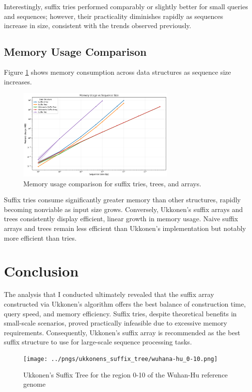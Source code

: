 \documentclass[11pt, letterpaper]{article}
\begin{document}
Interestingly, suffix tries performed comparably or slightly better for small queries and sequences; 
however, their practicality diminishes rapidly as sequences increase in size, consistent with the trends observed previously. 
\subsection{Memory Usage Comparison}

Figure \ref{fig:memory_usage} shows memory consumption across data structures as sequence size increases.

\begin{figure}[ht]
  \centering
  \includegraphics[width=0.7\textwidth]{../figures/memory_usage.png}
  \caption{Memory usage comparison for suffix tries, trees, and arrays.}
  \label{fig:memory_usage}
\end{figure}

Suffix tries consume significantly greater memory than other structures, 
rapidly becoming nonviable as input size grows. Conversely, Ukkonen’s suffix arrays and trees consistently display efficient, 
linear growth in memory usage. 
Naive suffix arrays and trees remain less efficient than Ukkonen’s implementation but notably more efficient than tries.

\section{Conclusion}
The analysis that I conducted ultimately revealed that the suffix array constructed via Ukkonen’s algorithm offers the best balance of construction time, query speed, and memory efficiency. 
Suffix tries, despite theoretical benefits in small-scale scenarios, proved practically infeasible due to excessive memory requirements. 
Consequently, Ukkonen's suffix array is recommended as the best suffix structure to use for large-scale sequence processing tasks.

\begin{figure}[htbp]
  \centering
  \texttt{[image: ../pngs/ukkonens\_suffix\_tree/wuhana-hu\_0-10.png]} %
  \caption{Ukkonen's Suffix Tree for the region 0-10 of the Wuhan-Hu reference genome}
  \label{fig:ukkonens_suffix_tree}
\end{figure}
\end{document}
